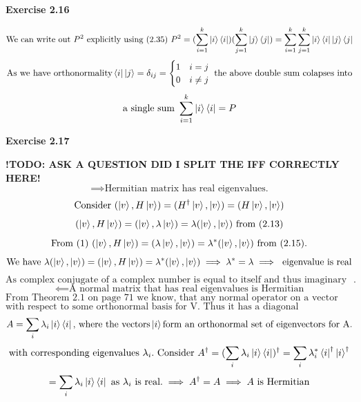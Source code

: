 \documentclass{article}
\begin{document}
\bigskip

\begin{framed}
    \noindent \textbf{Exercise 2.16}
    
    \medskip
    $$
    \text{We can write out } P^2 \text{ explicitly using (2.35) } P^{2} = (\sum_{i=1}^{k}{\ket{i}\bra{i}})(\sum_{j=1}^{k}{\ket{j}\bra{j}}) = \sum_{i=1}^{k}\sum_{j=1}^{k}\ket{i}\bra{i}\ket{j}\bra{j}
    $$
    $$
    \text{As we have orthonormality} \bra{i}\ket{j} = \delta_{ij} = \begin{cases}1 & i=j \\ 0 & i \neq j\end{cases} \text{ the above double sum colapses into}
    $$
    $$
    \text{a single sum }\sum_{i=1}^{k}{\ket{i}\bra{i}} = P
    $$
    
    
\end{framed}

\bigskip

\begin{framed}
    \noindent \textbf{Exercise 2.17}
    
    \medskip

    \textbf{!TODO: ASK A QUESTION DID I SPLIT THE IFF CORRECTLY HERE!}
    $$
    \implies \text{Hermitian matrix has real eigenvalues.}
    $$
    \begin{equation}
        \text{Consider } (\ket{v}, H\ket{v}) = (H^{\dagger}\ket{v}, \ket{v}) = (H\ket{v}, \ket{v})
    \end{equation}
    $$
    (\ket{v},H\ket{v}) = (\ket{v},\lambda\ket{v}) = \lambda(\ket{v},\ket{v}) \text{ from (2.13)}
    $$
    $$
    \text{From (1) } (\ket{v}, H\ket{v}) = (\lambda\ket{v}, \ket{v}) = \lambda^{*}(\ket{v}, \ket{v}) \text{ from (2.15)}.
    $$
    $$
    \text{We have } \lambda(\ket{v},\ket{v}) = (\ket{v}, H\ket{v}) = \lambda^{*} (\ket{v},\ket{v}) \implies \lambda^{*} = \lambda \implies \text{ eigenvalue is real}
    $$
    $$
    \text{As complex conjugate of a complex number is equal to itself and thus imaginary part is zero}.
    $$
    $$
    \impliedby \text{A normal matrix that has real eigenvalues is Hermitian}
    $$
    $$
    \text{From Theorem 2.1 on page 71 we know, that any normal operator on a vector space V is diagonal} 
    $$
    $$
    \text{with respect to some orthonormal basis for V. Thus it has a diagonal representation. Namely:}
    $$
    $$
    A = \sum_{i}{\lambda_i}\ket{i}\bra{i} \text{, where the vectors} \ket{i} \text{form an orthonormal set of eigenvectors for A}.
    $$
    $$
    \text{with corresponding eigenvalues } \lambda_{i}. \text{ Consider } A^{\dagger} = (\sum_{i}{\lambda_i}\ket{i}\bra{i})^{\dagger} = \sum_{i}{\lambda_i^{*}\bra{i}^{\dagger}\ket{i}^{\dagger}}
    $$
    $$
    = \sum_{i}\lambda_{i}\ket{i}\bra{i} \text{ as } \lambda_i \text{ is real}. \implies A^{\dagger} = A \implies A \text{ is Hermitian}
    $$
\end{framed}
\end{document}
